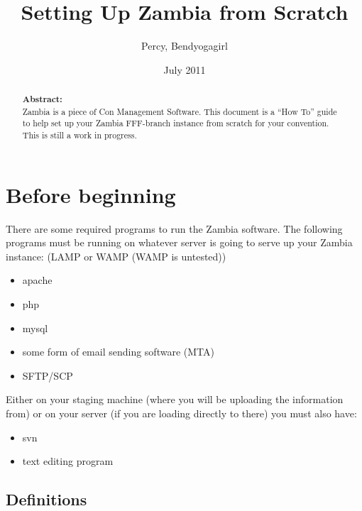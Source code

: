 \documentclass[tablesignature]{scrartcl}
\title{Setting Up Zambia from Scratch}
\author{Percy, Bendyogagirl}
\date{July 2011}
\begin{document}
\maketitle


\thispagestyle{fancy}
\renewcommand{\headrulewidth}{0pt}
\renewcommand{\footrulewidth}{1pt}
\lhead{}
\rhead{}
\chead{}
\cfoot{}
\rfoot{\thepage}
\begin{abstract}
\vspace{5cm}
{\LARGE{\textbf{Abstract:\\}}}
Zambia is a piece of Con Management Software.  This document is a ``How To'' guide to help set up your Zambia FFF-branch instance from scratch for your convention.  This is still a work in progress.
\end{abstract}
\newpage
\renewcommand{\headrulewidth}{1pt}
\tableofcontents
\listoftables
\listoffigures
\newpage
{}
\section{Before beginning}
\label{sec-1}


  There are some required programs to run the Zambia software.  The
  following programs must be running on whatever server is going to
  serve up your Zambia instance: (LAMP or WAMP (WAMP is untested))
\begin{itemize}
\item apache
\item php
\item mysql
\item some form of email sending software (MTA)
\item SFTP/SCP
\end{itemize}

  Either on your staging machine (where you will be uploading the
  information from) or on your server (if you are loading directly to
  there) you must also have:
\begin{itemize}
\item svn
\item text editing program
\end{itemize}
\subsection{Definitions}
\label{sec-1_1}
\end{document}
